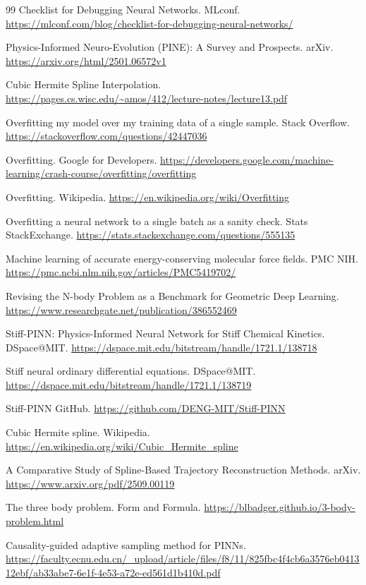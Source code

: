 \begin{thebibliography}{99}
 Checklist for Debugging Neural Networks. MLconf. \url{https://mlconf.com/blog/checklist-for-debugging-neural-networks/}

 Physics-Informed Neuro-Evolution (PINE): A Survey and Prospects. arXiv. \url{https://arxiv.org/html/2501.06572v1}

 Cubic Hermite Spline Interpolation. \url{https://pages.cs.wisc.edu/~amos/412/lecture-notes/lecture13.pdf}

 Overfitting my model over my training data of a single sample. Stack Overflow. \url{https://stackoverflow.com/questions/42447036}

 Overfitting. Google for Developers. \url{https://developers.google.com/machine-learning/crash-course/overfitting/overfitting}

 Overfitting. Wikipedia. \url{https://en.wikipedia.org/wiki/Overfitting}

 Overfitting a neural network to a single batch as a sanity check. Stats StackExchange. \url{https://stats.stackexchange.com/questions/555135}

 Machine learning of accurate energy-conserving molecular force fields. PMC NIH. \url{https://pmc.ncbi.nlm.nih.gov/articles/PMC5419702/}

 Revising the N-body Problem as a Benchmark for Geometric Deep Learning. \url{https://www.researchgate.net/publication/386552469}

 Stiff-PINN: Physics-Informed Neural Network for Stiff Chemical Kinetics. DSpace@MIT. \url{https://dspace.mit.edu/bitstream/handle/1721.1/138718}

 Stiff neural ordinary differential equations. DSpace@MIT. \url{https://dspace.mit.edu/bitstream/handle/1721.1/138719}

 Stiff-PINN GitHub. \url{https://github.com/DENG-MIT/Stiff-PINN}

 Cubic Hermite spline. Wikipedia. \url{https://en.wikipedia.org/wiki/Cubic_Hermite_spline}

 A Comparative Study of Spline-Based Trajectory Reconstruction Methods. arXiv. \url{https://www.arxiv.org/pdf/2509.00119}

 The three body problem. Form and Formula. \url{https://blbadger.github.io/3-body-problem.html}

 Causality-guided adaptive sampling method for PINNs. \url{https://faculty.ecnu.edu.cn/_upload/article/files/f8/11/825fbc4f4cb6a3576eb041312ebf/ab33abe7-6e1f-4e53-a72e-ed561d1b410d.pdf}


\end{thebibliography}
